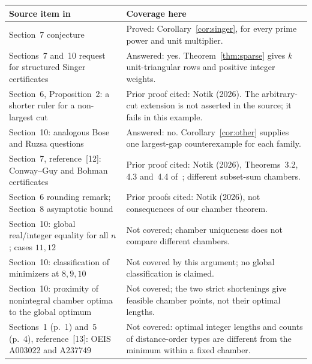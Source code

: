 \documentclass[11pt,a4paper]{article}
\begin{document}
\begin{center}
\small
\begin{tabular}{@{}>{\raggedright\arraybackslash}p{.39\linewidth}>{\raggedright\arraybackslash}p{.54\linewidth}@{}}
\toprule
Source item in \cite{notik} & Coverage here\\
\midrule
Section~7 conjecture
& Proved: Corollary~\ref{cor:singer}, for every prime power and unit multiplier.\\
Sections~7 and~10 request for structured Singer certificates
& Answered: yes. Theorem~\ref{thm:sparse} gives $k$ unit-triangular rows
and positive integer weights.\\
Section~6, Proposition~2: a shorter ruler for a non-largest cut
& Prior proof cited: Notik (2026). The arbitrary-cut extension is not
asserted in the source; it fails in this example.\\
Section~10: analogous Bose and Ruzsa questions
& Answered: no. Corollary~\ref{cor:other} supplies one largest-gap
counterexample for each family.\\
Section~7, reference~[12]: Conway--Guy and Bohman certificates
& Prior proof cited: Notik (2026), Theorems~3.2, 4.3 and~4.4 of~\cite{subset};
different subset-sum chambers.\\
Section~6 rounding remark; Section~8 asymptotic bound
& Prior proofs cited: Notik (2026), not consequences of our chamber theorem.\\
Section~10: global real/integer equality for all $n$; cases $11,12$
& Not covered; chamber uniqueness does not compare different chambers.\\
Section~10: classification of minimizers at $8,9,10$
& Not covered by this argument; no global classification is claimed.\\
Section~10: proximity of nonintegral chamber optima to the global optimum
& Not covered; the two strict shortenings give feasible chamber points,
not their optimal lengths.\\
Sections~1 (p.~1) and~5 (p.~4), reference~[13]: OEIS A003022 and A237749
& Not covered: optimal integer lengths and counts of distance-order types
are different from the minimum within a fixed chamber.\\
\bottomrule
\end{tabular}
\end{center}
\end{document}
